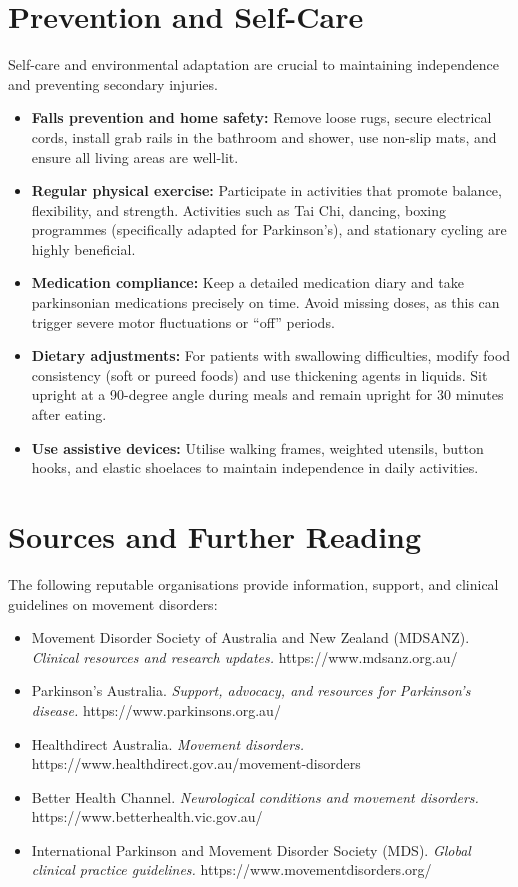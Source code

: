 \section*{Prevention and Self-Care}
Self-care and environmental adaptation are crucial to maintaining independence and preventing secondary injuries.
\begin{itemize}
    \item \textbf{Falls prevention and home safety:} Remove loose rugs, secure electrical cords, install grab rails in the bathroom and shower, use non-slip mats, and ensure all living areas are well-lit.
    \item \textbf{Regular physical exercise:} Participate in activities that promote balance, flexibility, and strength. Activities such as Tai Chi, dancing, boxing programmes (specifically adapted for Parkinson's), and stationary cycling are highly beneficial.
    \item \textbf{Medication compliance:} Keep a detailed medication diary and take parkinsonian medications precisely on time. Avoid missing doses, as this can trigger severe motor fluctuations or ``off'' periods.
    \item \textbf{Dietary adjustments:} For patients with swallowing difficulties, modify food consistency (soft or pureed foods) and use thickening agents in liquids. Sit upright at a 90-degree angle during meals and remain upright for 30 minutes after eating.
    \item \textbf{Use assistive devices:} Utilise walking frames, weighted utensils, button hooks, and elastic shoelaces to maintain independence in daily activities.
\end{itemize}

\section*{Sources and Further Reading}
The following reputable organisations provide information, support, and clinical guidelines on movement disorders:
\begin{itemize}
    \item Movement Disorder Society of Australia and New Zealand (MDSANZ). \textit{Clinical resources and research updates.} https://www.mdsanz.org.au/
    \item Parkinson's Australia. \textit{Support, advocacy, and resources for Parkinson's disease.} https://www.parkinsons.org.au/
    \item Healthdirect Australia. \textit{Movement disorders.} https://www.healthdirect.gov.au/movement-disorders
    \item Better Health Channel. \textit{Neurological conditions and movement disorders.} https://www.betterhealth.vic.gov.au/
    \item International Parkinson and Movement Disorder Society (MDS). \textit{Global clinical practice guidelines.} https://www.movementdisorders.org/
\end{itemize}
